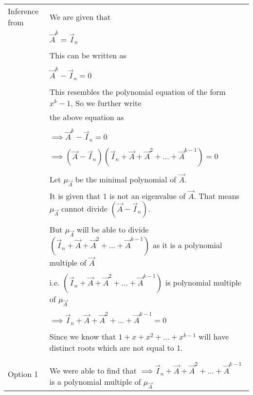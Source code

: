 	\begin{longtable}{|l|l|}
		\hline
		\multirow{3}{*}{Inference from }   
		& \\ 
		& We are given that \\the Given Data
		& \\
		& \qquad \qquad \qquad$\vec{A}^k = \vec{I}_n$ \\
		& \\
		& This can be written as \\
		& \\
		& \qquad \qquad \qquad$\vec{A}^k - \vec{I}_n = 0$ \\
		& \\
		& This resembles the polynomial equation of the form $x^{k}-1$, So we further write \\
		& the above equation as \\
		& \\
		& \qquad \qquad $\implies \vec{A}^k - \vec{I}_n = 0$ \\
		& \\
		& \qquad \qquad $\implies (\vec{A} - \vec{I}_n)(\vec{I}_n + \vec{A} + \vec{A}^2 + ... + \vec{A}^{k-1}) = 0$ \\
		& \\
		& Let $\mu_{\vec{A}}$ be the minimal polynomial of $\vec{A}$. \\
		& It is given that 1 is not an eigenvalue of $\vec{A}$. That means $\mu_{\vec{A}}$ cannot divide $(\vec{A} - \vec{I}_n)$.\\
		& \\
		& But $\mu_{\vec{A}}$ will be able to divide  $(\vec{I}_n + \vec{A} + \vec{A}^2 + ... + \vec{A}^{k-1})$ as it is a polynomial multiple of $\vec{A}$\\ 
		& \\
		& i.e. $(\vec{I}_n + \vec{A} + \vec{A}^2 + ... + \vec{A}^{k-1})$ is polynomial multiple of $\mu_{\vec{A}}$ \\
		& \\
		& \qquad \qquad  $\implies \vec{I}_n + \vec{A} + \vec{A}^2 + ... + \vec{A}^{k-1} = 0$ \\
		& \\
		& Since we know that $1 + x + x^2 + ... + x^{k-1}$ will have distinct roots which are not equal to 1. \\
		& \\
		\hline
		\multirow{3}{*}{Option 1  } & \\
		& We were able to find that $\implies \vec{I}_n + \vec{A} + \vec{A}^2 + ... + \vec{A}^{k-1}$ is a polynomial multiple of $\mu_{\vec{A}}$ \\

\end{longtable}
